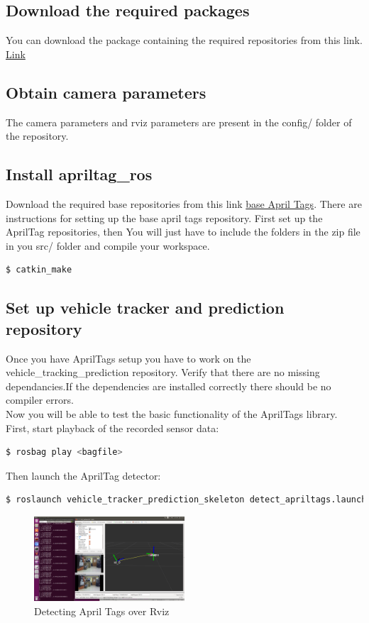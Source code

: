 \documentclass[letta4 paper]{article}
\numberwithin{equation}{section}
\newcommand{\0}{\mathbf{0}}
\begin{document}
	\subsection{Download the required packages }
	You can download the package containing the required repositories from this link. \href{https://drive.google.com/open?id=1yCs7dbwPPBzjbPul1k0SwnOg4jth4hTx}{Link}
	\subsection{Obtain camera parameters}
	The camera parameters and rviz parameters are present in the config/ folder of the repository.
	
	\subsection{Install apriltag\_ros}
	Download the required base repositories from this link \href{https://github.com/AprilRobotics/apriltag}{base April Tags}. There are instructions for setting up the base april tags repository. 
	First set up the AprilTag repositories, then You will just have to include the folders in the zip file in you src/ folder and compile your workspace. 
	
	\begin{lstlisting}[language=bash]
	$ catkin_make
	\end{lstlisting}
	
	
	\subsection{Set up vehicle tracker and prediction repository}
	Once you have AprilTags setup you have to work on the vehicle\_tracking\_prediction repository. Verify that there are no missing dependancies.If the dependencies are installed correctly there should be no compiler errors.\\
	Now you will be able to test the basic functionality of the AprilTags library. First, start playback of the recorded sensor data:
	\begin{lstlisting}[language=bash]
	$ rosbag play <bagfile>
	\end{lstlisting}
	Then launch the AprilTag detector:
	\begin{lstlisting}[language=bash]
	$ roslaunch vehicle_tracker_prediction_skeleton detect_apriltags.launch
	\end{lstlisting}
	
	\begin{figure}
		\centering
		\includegraphics[width=0.5\textwidth]{detect-apriltag-launch.png}
		\caption{Detecting April Tags over Rviz}
	\end{figure}
	
\end{document}

